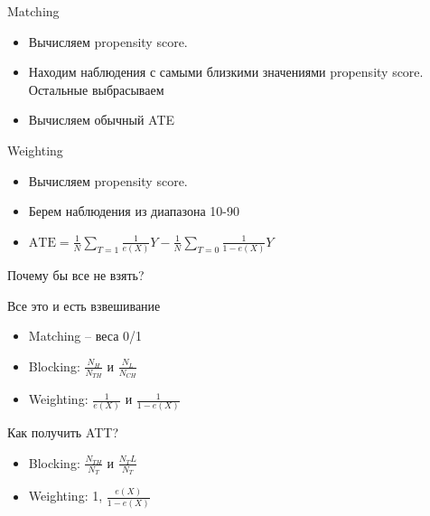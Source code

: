 \begin{frame}{Matching}
\begin{itemize}
    \item Вычисляем propensity score.
    \item Находим наблюдения с самыми близкими значениями propensity score. Остальные выбрасываем
    \item Вычисляем обычный ATE
\end{itemize}
\end{frame}

\begin{frame}{Weighting}
\begin{itemize}
    \item Вычисляем propensity score.
    \item Берем наблюдения из диапазона 10-90
    \item $\text{ATE} = \frac{1}{N}\sum_{T=1} \frac{1}{e(X)} Y - \frac{1}{N}\sum_{T=0} \frac{1}{1 - e(X)} Y$
\end{itemize}
    \item Почему бы все не взять?
\end{frame}


\begin{frame}{Все это и есть взвешивание}
\begin{itemize}
    \item Matching -- веса 0/1
    \item Blocking: $\frac{N_H}{N_{TH}}$ и $\frac{N_L}{N_{CH}}$
    \item Weighting: $\frac{1}{e(X)}$ и $\frac{1}{1 - e(X)}$
\end{itemize}


Как получить ATT?
\begin{itemize}
    \item Blocking: $\frac{N_{TH}}{N_{T}}$ и $\frac{N_TL}{N_{T}}$
    \item Weighting: 1, $\frac{e(X)}{1 - e(X)}$
\end{itemize}
\end{frame}





